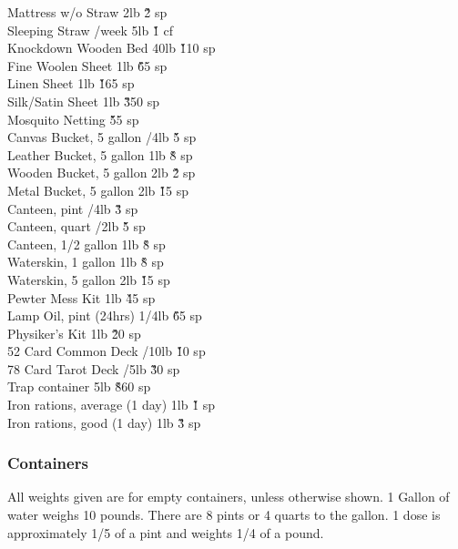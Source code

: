 \begin{multicols}{3}
{\begin{tabbing}
Mattress w/o Straw			\> 2lb			\' \` 2 sp \\
Sleeping Straw /week			\> 5lb			\' \` 1 cf \\
Knockdown Wooden Bed			\> 40lb			\' \` 110 sp \\
Fine Woolen Sheet			\> 1lb			\' \` 65 sp \\
Linen Sheet				\> 1lb			\' \` 165 sp \\
Silk/Satin Sheet			\> 1lb			\' \` 350 sp \\
Mosquito Netting						\' \` 55 sp \\
Canvas Bucket, 5 gallon			/4lb		\' \` 5 sp \\
Leather Bucket, 5 gallon		\> 1lb			\' \` 8 sp \\
Wooden Bucket, 5 gallon			\> 2lb			\' \` 2 sp \\
Metal Bucket, 5 gallon			\> 2lb			\' \` 15 sp \\
Canteen, pint				/4lb		\' \` 3 sp \\
Canteen, quart				/2lb		\' \` 5 sp \\
Canteen, 1/2 gallon			\> 1lb			\' \` 8 sp \\
Waterskin, 1 gallon			\> 1lb			\' \` 8 sp \\
Waterskin, 5 gallon			\> 2lb			\' \` 15 sp \\
Pewter Mess Kit				\> 1lb			\' \` 45 sp \\
Lamp Oil, pint (24hrs)			 1/4lb		\' \` 65 sp \\
Physiker's Kit				\> 1lb			\' \` 20 sp \\
52 Card Common Deck			/10lb		\' \` 10 sp \\
78 Card Tarot Deck			/5lb		\' \` 30 sp \\
Trap container				\> 5lb			\' \` 860 sp \\
Iron rations, average (1 day)		\> 1lb			\' \` 1 sp \\
Iron rations, good (1 day)		\> 1lb			\' \` 3 sp \\
\end{tabbing}

\subsubsection{Containers}

All weights given are for empty containers, unless otherwise shown.  1
Gallon of water weighs 10 pounds.  There are 8 pints or 4 quarts to
the gallon.  1 dose is approximately 1/5 of a pint and weights 1/4 of
a pound.

}
\end{multicols}
